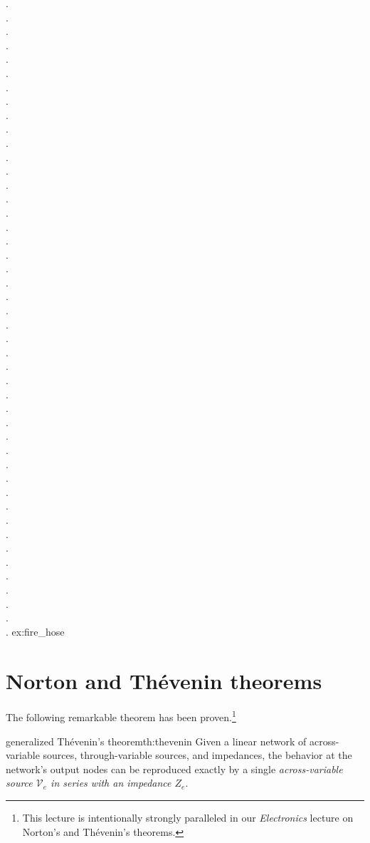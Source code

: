 \documentclass[dynamic_systems.tex]{subfiles}
\begin{document}
{.\\
.\\
.\\
.\\
.\\
.\\
.\\
.\\
.\\
.\\
.\\
.\\
.\\
.\\
.\\
.\\
.\\
.\\
.\\
.\\
.\\
.\\
.\\
.\\
.\\
.\\
.\\
.\\
.\\
.\\
.\\
.\\
.\\
.\\
.\\
.\\
.\\
.\\
.\\
.\\
.\\
.\\
.\\
.\\
.\\
.
}{%
ex:fire_hose%
}

\section[Norton and Thevenin theorems]{Norton and Th\'evenin theorems}
\tags{}

The following remarkable theorem has been proven.\footnote{This lecture is intentionally strongly paralleled in our \emph{Electronics} lecture on Norton's and Th\'evenin's theorems.}
\tags{}

\begin{Theorem}{generalized Th\'evenin's theorem}{th:thevenin}
  Given a linear network of across-variable sources, through-variable sources, and impedances, the behavior at the network's output nodes can be reproduced exactly by a single \emph{across-variable source $\mathcal{V}_e$ in series with an impedance $Z_e$}.
\end{Theorem}
\end{document}
